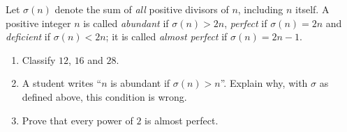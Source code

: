 Let $\sigma(n)$ denote the sum of \emph{all} positive divisors of $n$, including $n$ itself. A positive integer $n$ is called \emph{abundant} if $\sigma(n)>2n$, \emph{perfect} if $\sigma(n)=2n$ and \emph{deficient} if $\sigma(n)<2n$; it is called \emph{almost perfect} if $\sigma(n)=2n-1$.
\begin{enumerate}
\item[(a)] Classify $12$, $16$ and $28$.
\item[(b)] A student writes ``$n$ is abundant if $\sigma(n)>n$''. Explain why, with $\sigma$ as defined above, this condition is wrong.
\item[(c)] Prove that every power of $2$ is almost perfect.
\end{enumerate}
